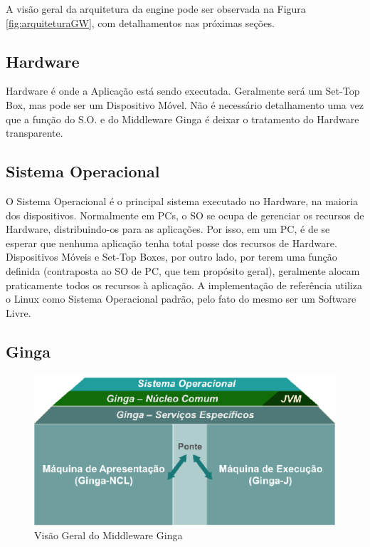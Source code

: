 \documentclass[
	12pt,				%
	openright,			%
	oneside,			%
	a4paper,			%
	brazil,				%
	]{abntex2}
\begin{document}
A visão geral da arquitetura da engine pode ser observada na Figura \ref{fig:arquiteturaGW}, com detalhamentos nas próximas seções.

\subsection{Hardware}

Hardware é onde a Aplicação está sendo executada. Geralmente será um Set-Top Box, mas pode ser um Dispositivo Móvel. Não é necessário detalhamento uma vez que a função do S.O. e do Middleware Ginga é deixar o tratamento do Hardware transparente.

\subsection{Sistema Operacional}

O Sistema Operacional é o principal sistema executado no Hardware, na maioria dos dispositivos. Normalmente em PCs, o SO se ocupa de gerenciar os recursos de Hardware, distribuindo-os para as aplicações. Por isso, em um PC, é de se esperar que nenhuma aplicação tenha total posse dos recursos de Hardware. Dispositivos Móveis e Set-Top Boxes, por outro lado, por terem uma função definida (contraposta ao SO de PC, que tem propósito geral), geralmente alocam praticamente todos os recursos à aplicação. A implementação de referência utiliza o Linux como Sistema Operacional padrão, pelo fato do mesmo ser um Software Livre.

\subsection{Ginga}

\begin{figure}
\centering
\includegraphics[scale=0.5]{ginga.png}
\caption{Visão Geral do Middleware Ginga}
\label{fig:ginga}
\end{figure}
\end{document}

